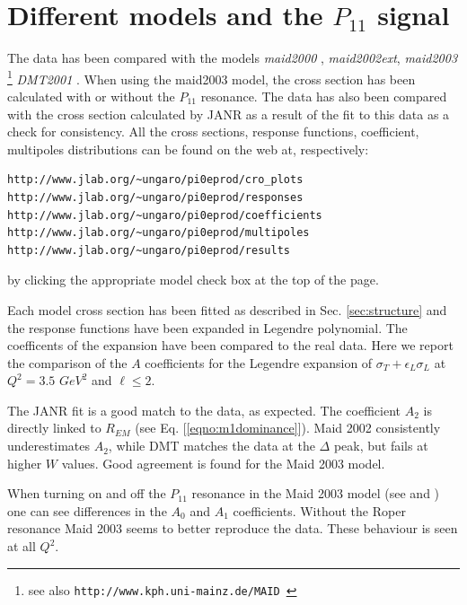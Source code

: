 \section{Different models and the $P_{11}$ signal}\label{sec:other_models}
The data has been compared with the models {\sl maid2000 }, {\sl maid2002ext}, 
{\sl maid2003} \cite{bib:maid2000}\footnote{see also {\tt http://www.kph.uni-mainz.de/MAID } }
{\sl DMT2001} \cite{bib:dmt2001}. When using the maid2003 model, the cross section
has been calculated with or without the $P_{11}$ resonance.
The data has also been compared with the cross section calculated by JANR as a result of the fit
to this data as a check for consistency.
All the cross sections, response functions, coefficient, multipoles distributions can be found
on the web at, respectively:
\begin{verbatim} 
http://www.jlab.org/~ungaro/pi0eprod/cro_plots
http://www.jlab.org/~ungaro/pi0eprod/responses
http://www.jlab.org/~ungaro/pi0eprod/coefficients
http://www.jlab.org/~ungaro/pi0eprod/multipoles
http://www.jlab.org/~ungaro/pi0eprod/results
\end{verbatim}
by clicking the appropriate model check box at the top of the page.

Each model cross section has been fitted as described in Sec. \ref{sec:structure}
and the response functions have been expanded in Legendre polynomial. The coefficents
of the expansion have been compared to the real data.
Here we report the comparison of the $A$ coefficients for the Legendre expansion of
$\sigma_T+\epsilon_L\sigma_L$ at $Q^2=3.5$ $GeV^2$ and $\ell\le 2$.

The JANR fit is a good match to the data, as expected. The coefficient $A_2$ is directly linked
to $R_{EM}$ (see Eq. [\ref{eqno:m1dominance}]). Maid 2002 consistently underestimates $A_2$, 
while DMT matches the data at the $\Delta $ peak, but fails at higher $W$ values.
Good agreement is found for the Maid 2003 model.

When turning on and off the $P_{11}$ resonance in the Maid 2003 model (see  and )
one can see differences in the $A_0$ and $A_1$ coefficients. Without the Roper resonance Maid 2003 seems to 
better reproduce the data. These behaviour is seen at all $Q^2$. 


